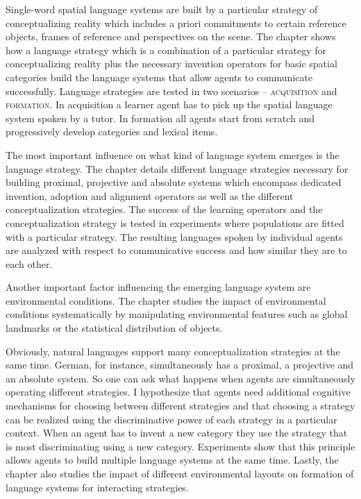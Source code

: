 Single-word spatial language systems are built by a particular strategy of 
conceptualizing reality which includes a priori commitments to certain reference 
objects, frames of reference and perspectives on the scene. The chapter shows how a 
language strategy which is a combination of a particular strategy for conceptualizing reality 
plus the necessary invention operators for basic spatial categories build the language systems 
that allow agents to communicate successfully. Language strategies are tested in two 
scenarios -- \textsc{acquisition} and \textsc{formation}. In acquisition a learner agent has to pick 
up the spatial language system spoken by a tutor. In formation all agents start from scratch 
and progressively develop categories and lexical items.

The most important influence on what kind of language system emerges is the 
language strategy. The chapter details different language strategies 
necessary for building proximal, projective and absolute systems which encompass
dedicated invention, adoption and alignment operators as well as the different 
conceptualization strategies. The success of the learning operators and the 
conceptualization strategy is tested in experiments where populations are fitted with a 
particular strategy. The resulting languages spoken by individual agents are analyzed with 
respect to communicative success and how similar they are to each other. 

Another important factor influencing the emerging 
language system are environmental conditions. The chapter studies the impact of 
environmental conditions systematically by manipulating environmental features 
such as global landmarks or the statistical distribution of objects. 

Obviously, natural languages support many conceptualization strategies at the same time.
German, for instance, simultaneously has a proximal, a projective and an absolute system. 
So one can ask what happens when agents are simultaneously operating 
different strategies. I hypothesize that agents need additional cognitive mechanisms 
for choosing between different strategies and that choosing a strategy can be realized
using the discriminative power of each strategy in a particular context. 
When an agent has to invent a new category they use the strategy that is most
discriminating using a new category. Experiments show that this principle
allows agents to build multiple language systems at the same time.
Lastly, the chapter also studies the impact of different environmental 
layouts on formation of language systems for interacting strategies.

